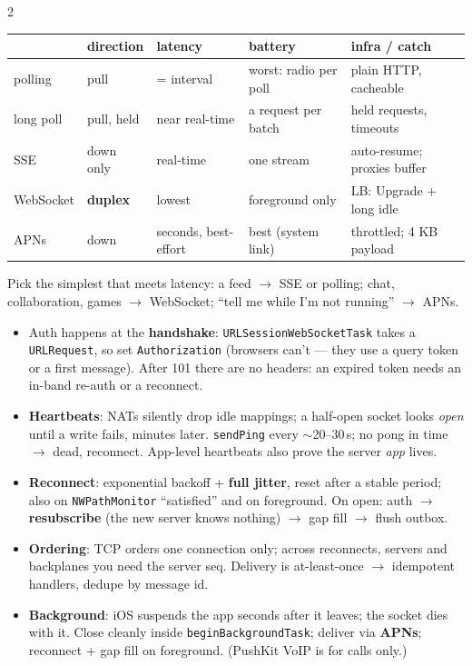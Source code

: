 \documentclass[8pt]{extarticle}
\newcommand\ct[1]{\texttt{#1}}
\newcommand\hd[1]{\par\vspace{3pt}\noindent{\bfseries\color{sheetBlue}#1}\par\vspace{1pt}}
\begin{document}
\begin{multicols}{2}
\raggedright{}

\hd{Choosing the transport}
{\footnotesize\setlength\tabcolsep{3pt}
\begin{tabular}{@{}>{\raggedright\arraybackslash}p{11mm}>{\raggedright\arraybackslash}p{11mm}>{\raggedright\arraybackslash}p{12mm}>{\raggedright\arraybackslash}p{15mm}>{\raggedright\arraybackslash}p{23mm}@{}}
\toprule
& \textbf{direction} & \textbf{latency} & \textbf{battery} & \textbf{infra / catch} \\ \midrule
polling & pull & = interval & worst: radio per poll & plain HTTP, cacheable \\
long poll & pull, held & near real-time & a request per batch & held requests, timeouts \\
SSE & down only & real-time & one stream & auto-resume; proxies buffer \\
WebSocket & \textbf{duplex} & lowest & foreground only & LB: Upgrade + long idle \\
APNs & down & seconds, best-effort & best (system link) & throttled; 4 KB payload \\
\bottomrule
\end{tabular}}\par
Pick the simplest that meets latency: a feed $\to$ SSE or polling; chat, collaboration, games
$\to$ WebSocket; ``tell me while I'm not running'' $\to$ APNs.

\hd{How it works}
\begin{itemize}
  \item Auth happens at the \textbf{handshake}: \ct{URLSessionWebSocketTask} takes a
        \ct{URLRequest}, so set \ct{Authorization} (browsers can't — they use a query token or a
        first message). After 101 there are no headers: an expired token needs an in-band
        re-auth or a reconnect.
  \item \textbf{Heartbeats}: NATs silently drop idle mappings; a half-open socket looks
        \emph{open} until a write fails, minutes later. \ct{sendPing} every $\sim$20–30\,s; no pong
        in time $\to$ dead, reconnect. App-level heartbeats also prove the server \emph{app} lives.
  \item \textbf{Reconnect}: exponential backoff + \textbf{full jitter}, reset after a stable period;
        also on \ct{NWPathMonitor} ``satisfied'' and on foreground. On open: auth $\to$
        \textbf{resubscribe} (the new server knows nothing) $\to$ gap fill $\to$ flush outbox.
  \item \textbf{Ordering}: TCP orders one connection only; across reconnects, servers and
        backplanes you need the server seq. Delivery is at-least-once $\to$ idempotent handlers,
        dedupe by message id.
  \item \textbf{Background}: iOS suspends the app seconds after it leaves; the socket dies with it.
        Close cleanly inside \ct{beginBackgroundTask}; deliver via \textbf{APNs}; reconnect + gap
        fill on foreground. (PushKit VoIP is for calls only.)
\end{itemize}


\end{multicols}
\end{document}
